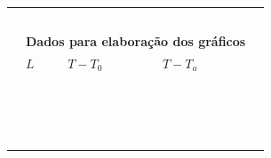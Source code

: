 \begin{table}[!ht]
\begin{tabular}{lllll}
		& \cellcolor[gray]{0.89} & \cellcolor[gray]{0.92} & \cellcolor[gray]{0.89} \\
		& \cellcolor[gray]{0.95} & \cellcolor[gray]{0.97} & \cellcolor[gray]{0.95} \\
		& \cellcolor[gray]{0.89} & \cellcolor[gray]{0.92} & \cellcolor[gray]{0.89} \\
		& \cellcolor[gray]{0.95} & \cellcolor[gray]{0.97} & \cellcolor[gray]{0.95} \\
		\cmidrule{2-4}
\\
		&\multicolumn{3}{l}{\textbf{Dados para elaboração dos gráficos}} \\
		\cmidrule{2-4}
		& $L$ & $T - T_0$ & $T - T_a$ \\
		\cmidrule{2-4}
		& \cellcolor[gray]{0.89} & \cellcolor[gray]{0.92} & \cellcolor[gray]{0.89} \\
		& \cellcolor[gray]{0.95} & \cellcolor[gray]{0.97} & \cellcolor[gray]{0.95} \\
		& \cellcolor[gray]{0.89} & \cellcolor[gray]{0.92} & \cellcolor[gray]{0.89} \\
		& \cellcolor[gray]{0.95} & \cellcolor[gray]{0.97} & \cellcolor[gray]{0.95} \\
		& \cellcolor[gray]{0.89} & \cellcolor[gray]{0.92} & \cellcolor[gray]{0.89} \\
		& \cellcolor[gray]{0.95} & \cellcolor[gray]{0.97} & \cellcolor[gray]{0.95} \\
		& \cellcolor[gray]{0.89} & \cellcolor[gray]{0.92} & \cellcolor[gray]{0.89} \\
		& \cellcolor[gray]{0.95} & \cellcolor[gray]{0.97} & \cellcolor[gray]{0.95} \\
		& \cellcolor[gray]{0.89} & \cellcolor[gray]{0.92} & \cellcolor[gray]{0.89} \\
		& \cellcolor[gray]{0.95} & \cellcolor[gray]{0.97} & \cellcolor[gray]{0.95} \\
		& \cellcolor[gray]{0.89} & \cellcolor[gray]{0.92} & \cellcolor[gray]{0.89} \\
		& \cellcolor[gray]{0.95} & \cellcolor[gray]{0.97} & \cellcolor[gray]{0.95} \\
		& \cellcolor[gray]{0.89} & \cellcolor[gray]{0.92} & \cellcolor[gray]{0.89} \\
		& \cellcolor[gray]{0.95} & \cellcolor[gray]{0.97} & \cellcolor[gray]{0.95} \\
		& \cellcolor[gray]{0.89} & \cellcolor[gray]{0.92} & \cellcolor[gray]{0.89} \\
		& \cellcolor[gray]{0.95} & \cellcolor[gray]{0.97} & \cellcolor[gray]{0.95} \\
		\bottomrule
	\end{tabular}
\end{table}

